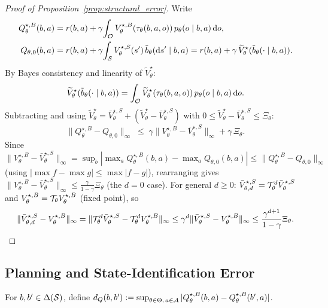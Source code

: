 \begin{proof}[Proof of Proposition~\ref{prop:structural_error}]
Write
\begin{align*}
Q_{\theta}^{\star,B}(b,a)
&=r(b,a)+\gamma\!\int_{{\mathcal{O}}}V_{\theta}^{\star,B}(\tau_\theta(b,a,o))\,p_\theta(o\mid b,a)\,\mathrm do,\\
Q_{\theta,0}(b,a)
&=r(b,a)+\gamma\!\int_{{\mathcal{S}}}V_\theta^{\star,S}(s')\,\tilde b_\theta(\mathrm ds'\mid b,a)
=r(b,a)+\gamma\,\widetilde V_\theta^{\star}(\tilde b_\theta(\cdot\mid b,a)).
\end{align*}
By Bayes consistency and linearity of $\widetilde V_\theta^{\star}$:
\[
\widetilde V_\theta^{\star}(\tilde b_\theta(\cdot\mid b,a))
=\int_{{\mathcal{O}}}\widetilde V_\theta^{\star}(\tau_\theta(b,a,o))\,p_\theta(o\mid b,a)\,\mathrm do.
\]
Subtracting and using $\widetilde V_\theta^{\star}=\bar V_\theta^{\star,S}+(\widetilde V_\theta^{\star}-\bar V_\theta^{\star,S})$ with $0\le \widetilde V_\theta^{\star}-\bar V_\theta^{\star,S}\le\Xi_\theta$:
\[
\|Q_\theta^{\star,B}-Q_{\theta,0}\|_\infty
\;\le\;
\gamma\|V_\theta^{\star,B}-\bar V_\theta^{\star,S}\|_\infty+\gamma\,\Xi_\theta.
\]
Since $\|V_\theta^{\star,B}-\bar V_\theta^{\star,S}\|_\infty=\sup_b|\max_a Q_\theta^{\star,B}(b,a)-\max_a Q_{\theta,0}(b,a)|\le\|Q_\theta^{\star,B}-Q_{\theta,0}\|_\infty$ (using $|\max f-\max g|\le\max|f-g|$), rearranging gives $\|V_\theta^{\star,B}-\bar V_\theta^{\star,S}\|_\infty\le\frac{\gamma}{1-\gamma}\Xi_\theta$ (the $d=0$ case). For general $d\ge 0$: $\bar V_{\theta,d}^{\star,S}={\mathcal{T}}_\theta^d\bar V_\theta^{\star,S}$ and $V_\theta^{\star,B}={\mathcal{T}}_\theta V_\theta^{\star,B}$ (fixed point), so
\[
\|\bar V_{\theta,d}^{\star,S}-V_\theta^{\star,B}\|_\infty
=\|{\mathcal{T}}_\theta^d\bar V_\theta^{\star,S}-{\mathcal{T}}_\theta^d V_\theta^{\star,B}\|_\infty
\le\gamma^d\|\bar V_\theta^{\star,S}-V_\theta^{\star,B}\|_\infty
\le\frac{\gamma^{d+1}}{1-\gamma}\Xi_\theta.\qedhere
\]
\end{proof}


\subsection{Planning and State-Identification Error}
\label{app:planning_state_proofs}

\begin{defn}\label{def:dQ}
For $b,b'\in\Delta({\mathcal{S}})$, define
$d_Q(b,b'):=\sup_{\theta\in\Theta,\,a\in{\mathcal{A}}}|Q_\theta^{\star,B}(b,a)-Q_\theta^{\star,B}(b',a)|$.
\end{defn}

